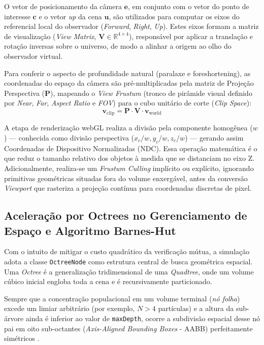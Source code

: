 \documentclass[11pt,a4paper]{article}
\begin{document}
O vetor de posicionamento da câmera $\mathbf{e}$, em conjunto com o vetor do ponto de interesse $\mathbf{c}$ e o vetor \textit{up} da cena $\mathbf{u}$, são utilizados para computar os eixos do referencial local do observador (\textit{Forward}, \textit{Right}, \textit{Up}). Estes eixos formam a matriz de visualização (\textit{View Matrix}, $\mathbf{V} \in \mathbb{R}^{4 \times 4}$), responsável por aplicar a translação e rotação inversas sobre o universo, de modo a alinhar a origem ao olho do observador virtual.

Para conferir o aspecto de profundidade natural (paralaxe e foreshortening), as coordenadas do espaço da câmera são pré-multiplicadas pela matriz de Projeção Perspectiva ($\mathbf{P}$), mapeando o \textit{View Frustum} (tronco de pirâmide visual definido por \textit{Near}, \textit{Far}, \textit{Aspect Ratio} e \textit{FOV}) para o cubo unitário de corte (\textit{Clip Space}):
\begin{equation}
    \mathbf{v}_{\text{clip}} = \mathbf{P} \cdot \mathbf{V} \cdot \mathbf{v}_{\text{world}}
\end{equation}

A etapa de renderização webGL realiza a divisão pela componente homogênea ($w$) — conhecida como divisão perspectiva ($x_c/w, y_c/w, z_c/w$) — gerando assim Coordenadas de Dispositivo Normalizadas (NDC). Essa operação matemática é o que reduz o tamanho relativo dos objetos à medida que se distanciam no eixo Z. Adicionalmente, realiza-se um \textit{Frustum Culling} implícito ou explícito, ignorando primitivas geométricas situadas fora do volume enxergável, antes da conversão \textit{Viewport} que rasteriza a projeção contínua para coordenadas discretas de pixel.

\subsection{Aceleração por Octrees no Gerenciamento de Espaço e Algoritmo Barnes-Hut}

Com o intuito de mitigar o custo quadrático da verificação mútua, a simulação adota a classe \texttt{OctreeNode} como estrutura central de busca geométrica espacial. Uma \textit{Octree} é a generalização tridimensional de uma \textit{Quadtree}, onde um volume cúbico inicial engloba toda a cena e é recursivamente particionado. 

Sempre que a concentração populacional em um volume terminal (\textit{nó folha}) excede um limiar arbitrário (por exemplo, $N > 4$ partículas) e a altura da sub-árvore ainda é inferior ao valor de \texttt{maxDepth}, ocorre a subdivisão espacial desse nó pai em oito sub-octantes (\textit{Axis-Aligned Bounding Boxes} - AABB) perfeitamente simétricos \cite{ericson}.
\end{document}
